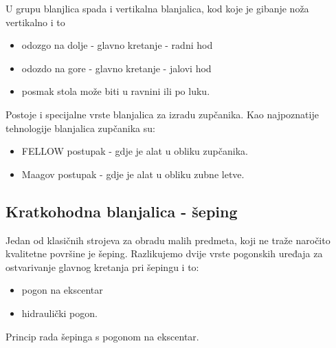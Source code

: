 \documentclass[a4paper,12pt]{article}
\numberwithin{figure}{section}
\begin{document}
U grupu blanjlica spada i vertikalna blanjalica, kod koje je gibanje noža vertikalno i to
\begin{itemize}
\item odozgo na dolje - glavno kretanje - radni hod
\item odozdo na gore - glavno kretanje - jalovi hod
\item posmak stola može biti u ravnini ili po luku.
\end{itemize}
Postoje i specijalne vrste blanjalica za izradu zupčanika. Kao najpoznatije tehnologije blanjalica zupčanika su:
\begin{itemize}
\item FELLOW postupak - gdje je alat u obliku zupčanika.
\item Maagov postupak - gdje je alat u obliku zubne letve.
\end{itemize}
\subsection{Kratkohodna blanjalica - šeping}
Jedan od klasičnih strojeva za obradu malih predmeta, koji ne traže naročito kvalitetne površine je šeping. Razlikujemo dvije vrste pogonskih uređaja za ostvarivanje glavnog kretanja pri šepingu i to:
\begin{itemize}
\item pogon na ekscentar
\item hidraulički pogon.
\end{itemize}
Princip rada šepinga s pogonom na ekscentar. 
\end{document}
